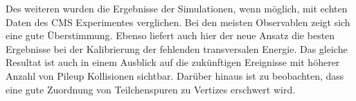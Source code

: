 Des weiteren wurden die Ergebnisse der Simulationen, wenn m\"o{}glich, mit echten Daten des CMS Experimentes verglichen. Bei den meisten Observablen zeigt sich eine gute \"U{}berstimmung. Ebenso liefert auch hier der neue Ansatz die besten Ergebnisse bei der Kalibrierung der fehlenden transversalen Energie. Das gleiche Resultat ist auch in einem Ausblick auf die zukünftigen Ereignisse mit h\"o{}herer Anzahl von Pileup Kollisionen sichtbar. Darüber hinaus ist zu beobachten, dass eine gute Zuordnung von Teilchenspuren zu Vertizes erschwert wird.

